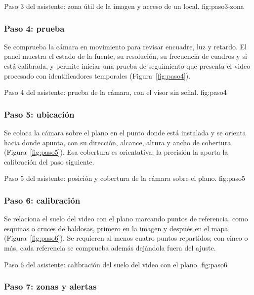   {Paso 3 del asistente: zona útil de la imagen y acceso de un local.}
  {fig:paso3-zona}

\subsubsection*{Paso 4: prueba}

Se comprueba la cámara en movimiento para revisar encuadre, luz y
retardo. El panel muestra el estado de la fuente, su resolución, su
frecuencia de cuadros y si está calibrada, y permite iniciar una prueba
de seguimiento que presenta el video procesado con identificadores
temporales (Figura~\ref{fig:paso4}).

  {Paso 4 del asistente: prueba de la cámara, con el visor sin señal.}
  {fig:paso4}

\subsubsection*{Paso 5: ubicación}

Se coloca la cámara sobre el plano en el punto donde está instalada y se
orienta hacia donde apunta, con su dirección, alcance, altura y ancho de
cobertura (Figura~\ref{fig:paso5}). Esa cobertura es orientativa: la
precisión la aporta la calibración del paso siguiente.

  {Paso 5 del asistente: posición y cobertura de la cámara sobre el plano.}
  {fig:paso5}

\subsubsection*{Paso 6: calibración}

Se relaciona el suelo del video con el plano marcando puntos de
referencia, como esquinas o cruces de baldosas, primero en la imagen y
después en el mapa (Figura~\ref{fig:paso6}). Se requieren al menos cuatro
puntos repartidos; con cinco o más, cada referencia se comprueba además
dejándola fuera del ajuste.

  {Paso 6 del asistente: calibración del suelo del video con el plano.}
  {fig:paso6}

\subsubsection*{Paso 7: zonas y alertas}

